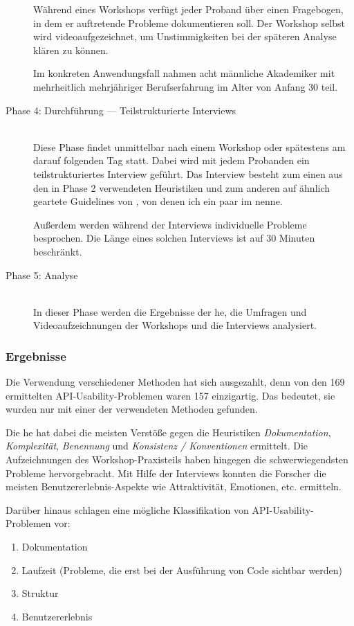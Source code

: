 \begin{description}
  Während eines Workshops verfügt jeder Proband über einen Fragebogen, in dem er auftretende Probleme dokumentieren soll. Der Workshop selbst wird videoaufgezeichnet, um Unstimmigkeiten bei der späteren Analyse klären zu können.
  
  Im konkreten Anwendungsfall nahmen acht männliche Akademiker mit mehrheitlich mehrjähriger Berufserfahrung im Alter von Anfang 30 teil.  
   
  \item[Phase 4: Durchführung --- Teilstrukturierte Interviews] \hfill \\
  Diese Phase findet unmittelbar nach einem Workshop oder spätestens am darauf folgenden Tag statt. Dabei wird mit jedem Probanden ein teilstrukturiertes Interview geführt. Das Interview besteht zum einen aus den in Phase 2 verwendeten Heuristiken und zum anderen auf ähnlich geartete Guidelines von \cite{Bloch:2006jk}, von denen ich ein paar im  nenne.
  
  Außerdem werden während der Interviews individuelle Probleme besprochen. Die Länge eines solchen Interviews ist auf 30 Minuten beschränkt.
   
  \item[Phase 5: Analyse] \hfill \\
  In dieser Phase werden die Ergebnisse der \gls{he}, die Umfragen und Videoaufzeichnungen der Workshops und die Interviews analysiert.
\end{description}



\subsubsection{Ergebnisse}

\begin{important}
Die Verwendung verschiedener Methoden hat sich ausgezahlt, denn von den 169 ermittelten API-Usability-Problemen waren 157 einzigartig. Das bedeutet, sie wurden nur mit einer der verwendeten Methoden gefunden.

Die \gls{he} hat dabei die meisten Verstöße gegen die Heuristiken \textit{Dokumentation}, \textit{Komplexität}, \textit{Benennung} und \textit{Konsistenz / Konventionen} ermittelt. Die Aufzeichnungen des Workshop-Praxisteils haben hingegen die schwerwiegendsten Probleme hervorgebracht. Mit Hilfe der Interviews konnten die Forscher die meisten Benutzererlebnis-Aspekte wie Attraktivität, Emotionen, etc. ermitteln.

Darüber hinaus schlagen \cite{Grill:2012jm} eine mögliche Klassifikation von API-Usability-Problemen vor:
\begin{enumerate}
\itemsep1pt\parskip0pt
  \item Dokumentation
  \item Laufzeit (Probleme, die erst bei der Ausführung von Code sichtbar werden)
  \item Struktur
  \item Benutzererlebnis
\end{enumerate}
\end{important}


